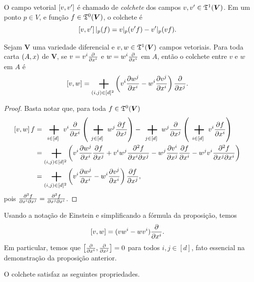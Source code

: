 O campo vetorial $\left[{v},{v'}\right]$ é chamado de \emph{colchete} dos campos $v,v' \in \mathfrak{T}^1(\bm V)$. Em um ponto $p \in V$, e função $f \in \mathfrak{T}^0(\bm V)$, o colchete é
	\begin{equation*}
	\left[{v},{v'}\right]|_p(f) = v|_p(v' f) - v'|_p(v f).
	\end{equation*}

\begin{proposition}
Sejam $\bm V$ uma variedade diferencial e $v,w \in \mathfrak{T}^1(\bm V)$ campos vetoriais. Para toda carta $(A,x)$ de $\bm V$, se $v = v^i \frac{\partial{}}{\partial{x^i}}$ e $w = w^i \frac{\partial{}}{\partial{x^i}}$ em $A$, então o colchete entre $v$ e $w$ em $A$ é
	\begin{equation*}
	\col{v}{w} = \sum_{(i,j) \in [d]^2} \left(v^i\derantiga{w^j}{\x^i} -  w^i\derantiga{v^j}{\x^i}\right) \derantiga{}{\x^j}.
	\end{equation*}
\end{proposition}
\begin{proof}
Basta notar que, para toda $f \in \mathfrak{T}^0(\bm V)$
	\begin{align*}
	\col{v}{w}f &= \sum_{i \in [d]} v^i \derantiga{}{\x^i} \left( \sum_{j \in [d]} w^j \derantiga{f}{\x^j} \right) - \sum_{j \in [d]} w^j \derantiga{}{\x^j} \left( \sum_{i \in [d]} v^i \derantiga{f}{\x^i} \right) \\
		&= \sum_{(i,j) \in [d]^2} \left( v^i \derantiga{w^j}{\x^i}\derantiga{f}{\x^j} + v^iw^j \derantiga{^2 f}{\x^i \partial \x^j} - w^j \derantiga{v^i}{\x^j}\derantiga{f}{\x^i} - w^jv^i \derantiga{^2 f}{\x^j \partial \x^i} \right)\\
		&= \sum_{(i,j) \in [d]^2} \left(v^i\derantiga{w^j}{\x^i} -  w^i\derantiga{v^j}{\x^i}\right) \derantiga{f}{\x^j},
	\end{align*}
pois $\frac{\partial{^2 f}}{\partial{x^i \partial x^j}} = \frac{\partial{^2 f}}{\partial{x^j \partial x^i}}$.
\end{proof}

Usando a notação de Einstein e simplificando a fórmula da proposição, temos
	\begin{equation*}
	\left[{v},{w}\right] = (vw^i - wv^i)\frac{\partial{}}{\partial{x^i}}.
	\end{equation*}
Em particular, temos que $\left[{\frac{\partial{}}{\partial{x^i}}},{\frac{\partial{}}{\partial{x^j}}}\right] = 0$ para todos $i,j \in [d]$, fato essencial na demonstração da proposição anterior.

O colchete satisfaz as seguintes propriedades.

